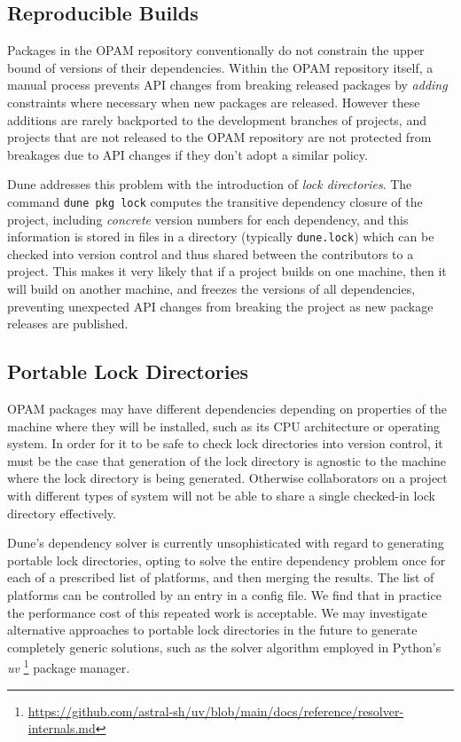 \documentclass{article}
\begin{document}
\begin{multicols}{2}
        \section {Reproducible Builds}

        Packages in the OPAM repository conventionally do not constrain the
        upper bound of versions of their dependencies. Within the OPAM
        repository itself, a manual process prevents API changes from breaking
        released packages by \textit{adding} constraints where necessary when
        new packages are released. However these additions are rarely
        backported to the development branches of projects, and projects that
        are not released to the OPAM repository are not protected from
        breakages due to API changes if they don't adopt a similar policy.

        Dune addresses this problem with the introduction of \textit{lock
        directories}. The command \texttt{dune pkg lock} computes the transitive
        dependency closure of the project, including \textit{concrete} version
        numbers for each dependency, and this information is stored in files in
        a directory (typically \texttt{dune.lock}) which can be checked into
        version control and thus shared between the contributors to a project.
        This makes it very likely that if a project builds on one machine, then
        it will build on another machine, and freezes the versions of all
        dependencies, preventing unexpected API changes from breaking the
        project as new package releases are published.

        \subsection {Portable Lock Directories}

        OPAM packages may have different dependencies depending on properties of
        the machine where they will be installed, such as its CPU architecture
        or operating system. In order for it to be safe to check lock
        directories into version control, it must be the case that generation of
        the lock directory is agnostic to the machine where the lock directory
        is being generated. Otherwise collaborators on a project with different
        types of system will not be able to share a single checked-in lock
        directory effectively.

        Dune's dependency solver is currently unsophisticated with regard to
        generating portable lock directories, opting to solve the entire
        dependency problem once for each of a prescribed list of platforms, and
        then merging the results. The list of platforms can be controlled by an
        entry in a config file. We find that in practice the performance cost of
        this repeated work is acceptable. We may investigate alternative
        approaches to portable lock directories in the future to
        generate completely generic solutions, such as the solver algorithm
        employed in Python's \textit{uv}
        \footnote{\url{https://github.com/astral-sh/uv/blob/main/docs/reference/resolver-internals.md}}
        package manager.


\end{multicols}
\end{document}
